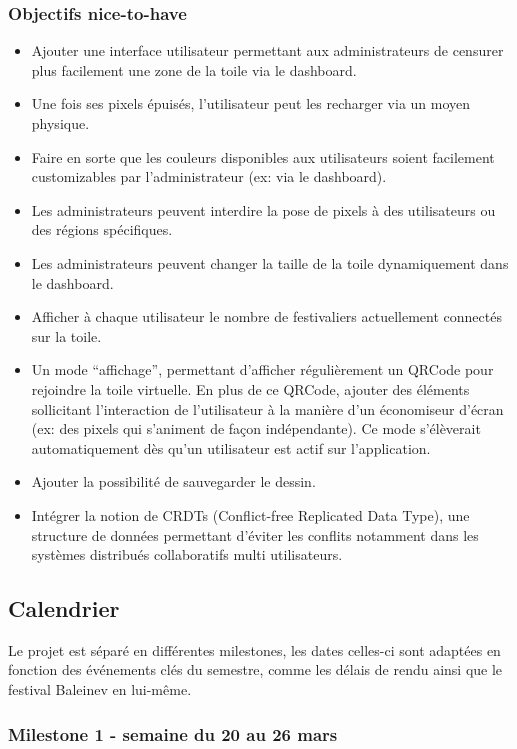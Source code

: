 \subsubsection{Objectifs \guillemotleft nice-to-have\guillemotright}

\begin{itemize}
  \item Ajouter une interface utilisateur permettant aux administrateurs de censurer plus facilement une zone de la toile via le dashboard.
  \item Une fois ses pixels épuisés, l'utilisateur peut les recharger via un moyen physique.
  \item Faire en sorte que les couleurs disponibles aux utilisateurs soient facilement customizables par l'administrateur (ex: via le dashboard).
  \item Les administrateurs peuvent interdire la pose de pixels à des utilisateurs ou des régions spécifiques.
  \item Les administrateurs peuvent changer la taille de la toile dynamiquement dans le dashboard.
  \item Afficher à chaque utilisateur le nombre de festivaliers actuellement connectés sur la toile.
  \item Un mode “affichage”, permettant d'afficher régulièrement un QRCode pour rejoindre la toile virtuelle. En plus de ce QRCode, ajouter des éléments sollicitant l'interaction de l'utilisateur à la manière d'un économiseur d'écran (ex: des pixels qui s'animent de façon indépendante). Ce mode s'élèverait automatiquement dès qu'un utilisateur est actif sur l'application.
  \item Ajouter la possibilité de sauvegarder le dessin.
  \item Intégrer la notion de CRDTs (Conflict-free Replicated Data Type), une structure de données permettant d'éviter les conflits notamment dans les systèmes distribués collaboratifs multi utilisateurs.
\end{itemize}

\subsection{Calendrier}

Le projet est séparé en différentes milestones, les dates celles-ci sont adaptées en fonction des événements clés du semestre, comme les délais de rendu ainsi que le festival Baleinev en lui-même.

\subsubsection{Milestone 1 - semaine du 20 au 26 mars}

